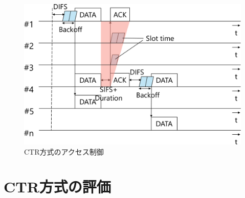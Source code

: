 \documentclass[a4paper,10pt]{ltjsarticle}
\begin{document}
\begin{figure}[H]
  \centering
  \includegraphics[width=\linewidth]{CTR_accsess.pdf} 
  \caption{CTR方式のアクセス制御}
  \label{fig:CTR方式のアクセス制御}
\end{figure}
\section{CTR方式の評価}
\end{document}
